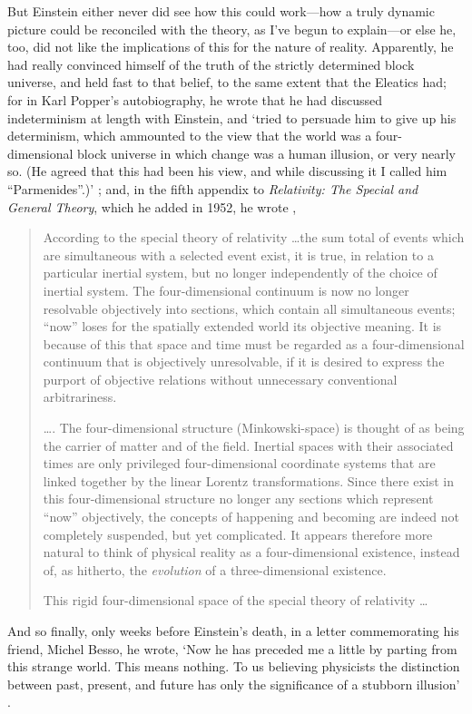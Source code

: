 But Einstein either never did see how this could work---how a truly dynamic picture could be reconciled with the theory, as I've begun to explain---or else he, too, did not like the implications of this for the nature of reality. Apparently, he had really convinced himself of the truth of the strictly determined block universe, and held fast to that belief, to the same extent that the Eleatics had; for in Karl Popper's autobiography, he wrote that he had discussed indeterminism at length with Einstein, and `tried to persuade him to give up his determinism, which ammounted to the view that the world was a four-dimensional block universe in which change was a human illusion, or very nearly so. (He agreed that this had been his view, and while discussing it I called him ``Parmenides''.)' \cite{Popper2002}; and, in the fifth appendix to \textit{Relativity: The Special and General Theory}, which he added in 1952, he wrote \cite{Einstein2001},
\begin{quotation}
According to the special theory of relativity \ldots the sum total of events which are simultaneous with a selected event exist, it is true, in relation to a particular inertial system, but no longer independently of the choice of inertial system. The four-dimensional continuum is now no longer resolvable objectively into sections, which contain all simultaneous events; ``now'' loses for the spatially extended world its objective meaning. It is because of this that space and time must be regarded as a four-dimensional continuum that is objectively unresolvable, if it is desired to express the purport of objective relations without unnecessary conventional arbitrariness.

\ldots. The four-dimensional structure (Minkowski-space) is thought of as being the carrier of matter and of the field. Inertial spaces with their associated times are only privileged four-dimensional coordinate systems that are linked together by the linear Lorentz transformations. Since there exist in this four-dimensional structure no longer any sections which represent ``now'' objectively, the concepts of happening and becoming are indeed not completely suspended, but yet complicated. It appears therefore more natural to think of physical reality as a four-dimensional existence, instead of, as hitherto, the \textit{evolution} of a three-dimensional existence.

This rigid four-dimensional space of the special theory of relativity \ldots
\end{quotation}
And so finally, only weeks before Einstein's death, in a letter commemorating his friend, Michel Besso, he wrote, `Now he has preceded me a little by parting from this strange world. This means nothing. To us believing physicists the distinction between past, present, and future has only the significance of a stubborn illusion' \cite{Foelsing1997}.

